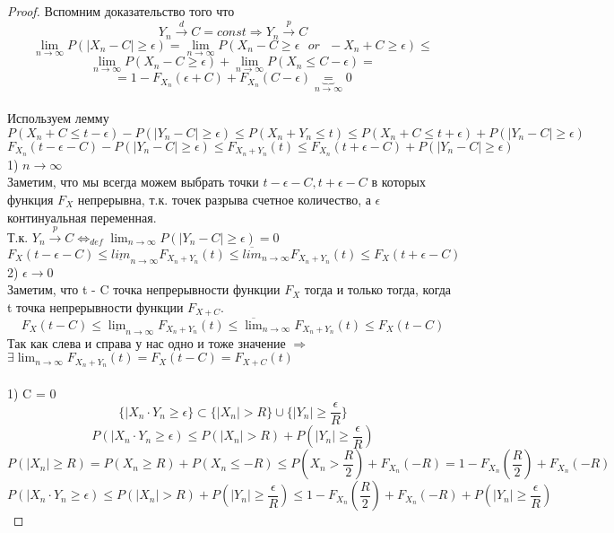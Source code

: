 	\begin{proof}
		Вспомним доказательство того что
		$$Y_n\xrightarrow{d}C = const \Rightarrow Y_n\xrightarrow{p}C$$
		$$\lim_{n\to\infty}P(|X_n - C| \geqslant \epsilon) = \lim_{n\to\infty}P(X_n - C \geqslant \epsilon\text{ }or\text{ } -X_n + C \geqslant \epsilon)\leqslant$$
		$$ \lim_{n\to\infty}P(X_n - C\geqslant \epsilon) + \lim_{n\to\infty}P(X_n \leqslant C - \epsilon) =$$ 
		$$= 1 - F_{X_n}(\epsilon + C) + F_{X_n}(C - \epsilon) \underbrace{=}_{n\to\infty} 0$$
		\text{ }\\
		Используем лемму
		$$ P(X_n + C \leqslant t - \epsilon)- P(|Y_n - C|\geqslant\epsilon)\leqslant P(X_n + Y_n\leqslant t) \leqslant P(X_n + C\leqslant t + \epsilon) + P(|Y_n - C|\geqslant\epsilon) $$
		$$ F_{X_n}(t - \epsilon - C)- P(|Y_n - C|\geqslant\epsilon)\leqslant F_{X_n + Y_n}(t) \leqslant F_{X_n} (t + \epsilon - C)+ P(|Y_n - C|\geqslant\epsilon) $$
		1) $ n\to\infty $\\
		Заметим, что мы всегда можем выбрать точки $ t - \epsilon - C, t + \epsilon - C $ в которых функция $ F_X $ непрерывна, т.к. точек разрыва счетное количество, а $ \epsilon $ континуальная переменная.\\
		Т.к. $ Y_n\xrightarrow{p}C \Leftrightarrow_{def} \lim_{n\to\infty}P(|Y_n - C|\geqslant\epsilon) = 0 $
		$$ F_{X}(t - \epsilon - C)\leqslant \underline{lim}_{n\to\infty}F_{X_n + Y_n}(t)\leqslant \overline{lim}_{n\to\infty}F_{X_n + Y_n}(t) \leqslant F_{X} (t + \epsilon - C)$$
		2) $ \epsilon \to 0 $\\
		Заметим, что t - C точка непрерывности функции $ F_X $ тогда и только тогда, когда t точка непрерывности функции $ F_{X + C}  $.
		$$ F_{X}(t - C)\leqslant \underline{\lim}_{n\to\infty}F_{X_n + Y_n}(t)\leqslant \overline{\lim}_{n\to\infty}F_{X_n + Y_n}(t) \leqslant F_{X} (t  - C)$$
		Так как слева и справа у нас одно и тоже значение $ \Rightarrow $
		$\exists \lim_{n\to\infty}F_{X_n + Y_n}(t) = F_{X} (t  - C) = F_{X + C} (t)$
		\text{ }\\
		\text{ }\\
		1) C = 0\\
		$$ \{|X_n\cdot Y_n \geqslant \epsilon\} \subset \{|X_n| > R\}\cup \{|Y_n| \geqslant \frac{\epsilon}{R}\}$$
		$$ P(|X_n\cdot Y_n \geqslant \epsilon ) \leqslant P(|X_n| > R) + P(|Y_n| \geqslant \frac{\epsilon}{R}) $$
		$$ P(|X_n| \geqslant R) = P(X_n \geqslant R) + P(X_n \leqslant -R) \leqslant P(X_n > \frac{R}{2}) + F_{X_n}(-R) = 1 - F_{X_n}(\frac{R}{2}) + F_{X_n}(-R)$$
		$$ P(|X_n\cdot Y_n \geqslant \epsilon ) \leqslant P(|X_n| > R) + P(|Y_n| \geqslant \frac{\epsilon}{R}) \leqslant 1 - F_{X_n}(\frac{R}{2}) + F_{X_n}(-R) + P(|Y_n| \geqslant \frac{\epsilon}{R})$$

\end{proof}
